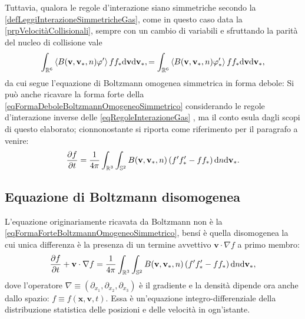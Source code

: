         Tuttavia, qualora le regole d'interazione siano simmetriche secondo la \cref{defLeggiInterazioneSimmetricheGas}, come in questo caso data la \cref{prpVelocitàCollisionali}, sempre con un cambio di variabili e sfruttando la parità del nucleo di collisione vale
        \begin{equation*}
          \int_{\mathbb R^6}\left\langle
            B(\mathbf v,\mathbf v_*,n)\varphi'
          \right\rangle ff_*\mathrm{d}\mathbf v\mathrm{d}\mathbf v_*,
          =\int_{\mathbb R^6}\left\langle
            B(\mathbf v,\mathbf v_*,n)\varphi'_*
          \right\rangle ff_*\mathrm{d}\mathbf v\mathrm{d}\mathbf v_*,
        \end{equation*}
        da cui segue l'equazione di Boltzmann omogenea simmetrica in forma debole\footnotemark{}:%
        Si può anche ricavare la forma forte della \ref{eqFormaDeboleBoltzmannOmogeneoSimmetrico} considerando le regole d'interazione inverse delle \ref{eqRegoleInterazioneGas} \cite[§ 2.5, p. 15]{Loy2025EKTMAS}, ma il conto esula dagli scopi di questo elaborato; cionnonostante si riporta come riferimento per il paragrafo a venire:
        \begin{equation}
          \label{eqFormaForteBoltzmannOmogeneoSimmetrico}
          \frac{\partial f}{\partial t}=\frac1{4\pi}\int_{\mathbb R^3}\int_{\mathbb S^2}
          B(\mathbf v,\mathbf v_*,n)\left(f'f'_*-ff_*\right)\mathrm{d} n\mathrm{d}\mathbf v_*.
        \end{equation}

    \subsection{Equazione di Boltzmann disomogenea}\label{secBoltzmannDisomogeno}

      L'equazione originariamente ricavata da Boltzmann non è la \eqref{eqFormaForteBoltzmannOmogeneoSimmetrico}, bensí è quella disomogenea la cui unica differenza è la presenza di un termine avvettivo \(\mathbf v\cdot\nabla f\) a primo membro:
      \begin{equation}
        \label{eqFormaForteBoltzmannDisomogeneoSimmetrico}
        \frac{\partial f}{\partial t}+\mathbf v\cdot\nabla f
        =\frac1{4\pi}\int_{\mathbb R^3}\int_{\mathbb S^2}
        B(\mathbf v,\mathbf v_*,n)\left(f'f'_*-ff_*\right)
        \mathrm{d} n\mathrm{d}\mathbf v_*,
      \end{equation}
      dove l'operatore \(\nabla\equiv(\partial_{x_1},\partial_{x_2},\partial_{x_3})\) è il gradiente e la densità dipende ora anche dallo spazio: \(f\equiv f(\mathbf x,\mathbf v,t)\). Essa è un'equazione integro-differenziale della distribuzione statistica delle posizioni e delle velocità in ogn'istante.

